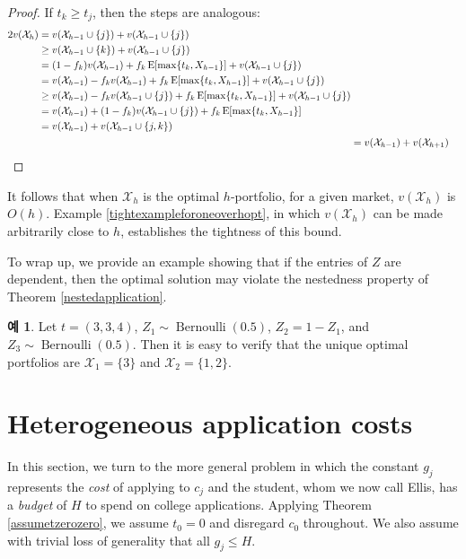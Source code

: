 \documentclass[12pt]{article} %
\theoremstyle{definition}
\newtheorem{example}{Example}
\theoremstyle{definition}
\newtheorem{example}{예}
\begin{document}
\begin{proof}
If $t_k \geq t_j$, then the steps are analogous:
\begin{align}
\begin{split}
2 v(\mathcal{X}_h) &= v(\mathcal{X}_{h-1} \cup\{j\}) + v(\mathcal{X}_{h-1} \cup\{j\}) \\
&\geq v(\mathcal{X}_{h-1} \cup\{k\}) + v(\mathcal{X}_{h-1} \cup\{j\}) \\
&= (1 - f_k) v(\mathcal{X}_{h-1}) + f_k \operatorname{E}[\max\{t_k, X_{h-1}\}] +  v(\mathcal{X}_{h-1} \cup\{j\})  \\
&= v(\mathcal{X}_{h-1}) - f_k  v(\mathcal{X}_{h-1}) + f_k \operatorname{E}[\max\{t_k, X_{h-1}\}] +  v(\mathcal{X}_{h-1} \cup\{j\})  \\
&\geq v(\mathcal{X}_{h-1}) - f_k  v(\mathcal{X}_{h-1}\cup\{j\}) + f_k \operatorname{E}[\max\{t_k, X_{h-1}\}] +  v(\mathcal{X}_{h-1} \cup\{j\})  \\
&= v(\mathcal{X}_{h-1}) + (1 - f_k) v(\mathcal{X}_{h-1}\cup\{j\}) + f_k \operatorname{E}[\max\{t_k, X_{h-1}\}]  \\
&= v(\mathcal{X}_{h-1}) + v(\mathcal{X}_{h-1} \cup\{j, k\})
\end{split}\\
&= v(\mathcal{X}_{h-1})  + v(\mathcal{X}_{h+1}) \qedhere
\end{align}
\end{proof}

It follows that when $\mathcal{X}_h$ is the optimal $h$-portfolio, for a given market, $v(\mathcal{X}_h)$ is $O(h)$. Example \ref{tightexampleforoneoverhopt}, in which $v(\mathcal{X}_h)$ can be made arbitrarily close to $h$, establishes the tightness of this bound.

To wrap up, we provide an example showing that if the entries of $Z$ are dependent, then the optimal solution may violate the nestedness property of Theorem \ref{nestedapplication}.
\begin{example}
Let $t = (3, 3, 4)$, $Z_1 \sim \operatorname{Bernoulli}(0.5)$, $Z_2 = 1 - Z_1$,  and $Z_3 \sim \operatorname{Bernoulli}(0.5)$. Then it is easy to verify that the unique optimal portfolios are $\mathcal{X}_1 = \{3\}$ and $\mathcal{X}_2 = \{1, 2\}$. 
\end{example}








\section{Heterogeneous application costs}
In this section, we turn to the more general problem in which the constant $g_j$ represents the \emph{cost} of applying to $c_j$ and the student, whom we now call Ellis, has a \emph{budget} of $H$ to spend on college applications. Applying Theorem \ref{assumetzerozero}, we assume $t_0 = 0$ and disregard $c_0$ throughout. We also assume with trivial loss of generality that all $g_j \leq H$. 
\end{document}
